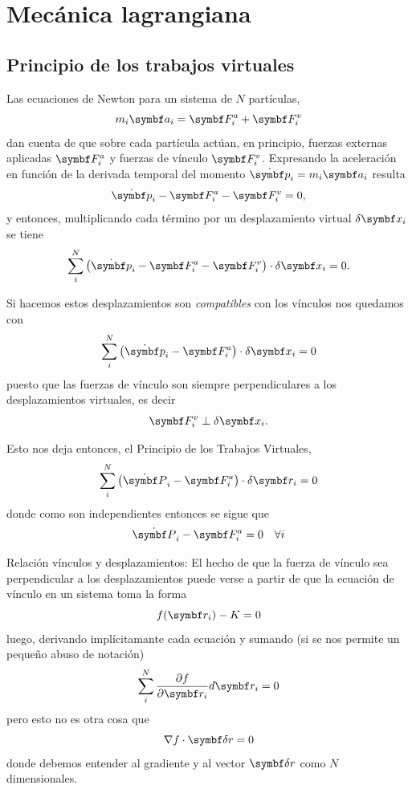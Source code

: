 \documentclass[10pt,oneside]{CBFT_book}
\begin{document}
\chapter{Mecánica lagrangiana}

\section{Principio de los trabajos virtuales}
Las ecuaciones de Newton para un sistema de $N$ partículas,
\[
	m_i \vb{a}_i = \vb{F}_i^a + \vb{F}_i^v
\]
dan cuenta de que sobre cada partícula actúan, en principio, fuerzas externas aplicadas $ \vb{F}_i^a $
y fuerzas de vínculo $ \vb{F}_i^v $. Expresando la aceleración en función de la derivada temporal del momento  
$ \dot{\vb{p}}_i = m_i \vb{a}_i$ resulta 
\[
	\dot{\vb{p}}_i - \vb{F}_i^a - \vb{F}_i^v = 0,
\]
y entonces, multiplicando cada término por un desplazamiento virtual $ \delta\vb{x}_i $ se tiene
\[
	\sum_i^N \left( \dot{\vb{p}}_i - \vb{F}_i^a - \vb{F}_i^v \right) \cdot \delta\vb{x}_i  = 0.
\]

Si hacemos estos desplazamientos son {\it compatibles} con los vínculos nos quedamos con
\[
	\sum_i^N \left( \dot{\vb{p}}_i - \vb{F}_i^a \right) \cdot \delta\vb{x}_i = 0
\]
puesto que las fuerzas de vínculo son siempre perpendiculares a los desplazamientos virtuales, es decir 
\[
	\vb{F}_i^v \perp \delta\vb{x}_i.
\]


Esto nos deja entonces, el Principio de los Trabajos Virtuales,
\[
	\sum_i^N \left( \dot{\vb{P}}_i - \vb{F}_i^a \right) \cdot \delta\vb{r}_i = 0 
\]
donde como son independientes entonces se sigue que
\[
	\dot{\vb{P}}_i - \vb{F}_i^a = 0 \quad \forall i
\]

\begin{notas}{Relación vínculos y desplazamientos:}
El hecho de que la fuerza de vínculo sea perpendicular a los desplazamientos puede
verse a partir de que la ecuación de vínculo en un sistema toma la forma
\[
	f(\vb{r}_i) - K = 0 
\]
luego, derivando implícitamante cada ecuación y sumando (si se nos permite un pequeño
abuso de notación)
\[
	\sum_i^N \dpar{f}{\vb{r}_i} d\vb{r}_i = 0 
\]
pero esto no es otra cosa que
\[
	\nabla f \cdot \vb{\delta r} = 0
\]
donde debemos entender al gradiente y al vector $\vb{\delta r}$ como $N$ dimensionales.
\end{notas}
\end{document}
